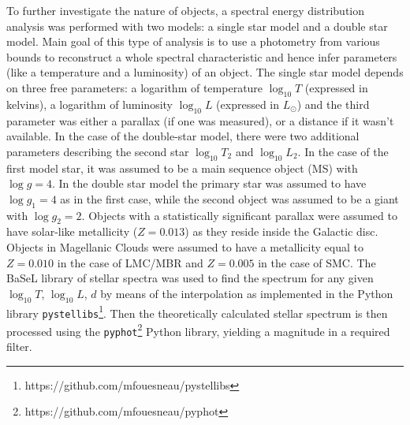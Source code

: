 \documentclass{pracalicmgr}
\begin{document}
To further investigate the nature of objects, a spectral energy distribution analysis was
performed with two models: a single star model and a double star model. Main goal of this type of analysis is to use a photometry from various bounds to
reconstruct a whole spectral characteristic and hence infer parameters (like a temperature and a luminosity) of an object.
The single star model depends on three free parameters: a logarithm of temperature $\log_{10}T$ (expressed in kelvins), a logarithm of luminosity $\log_{10} L$ (expressed in $L_{\odot}$) and the third
parameter was either a parallax (if one was measured), or a distance if it wasn't available. In the case of the double-star model, there were two additional parameters describing the
second star $\log_{10} T_2$ and $\log_{10} L_2$. In the case of the first model star, it was assumed to be a main sequence object (MS) with $\log{g}=4$. In the double star model the primary star
was assumed to have $\log{g_1}=4$ as in the first case, while the second object was assumed to be a giant with $\log{g_2}=2$. Objects with a statistically significant parallax were assumed to have solar-like
metallicity ($Z=0.013$) as they reside inside the Galactic disc. Objects in Magellanic Clouds
were assumed to have a metallicity equal to $Z=0.010$ in the case of LMC/MBR and $Z=0.005$ in the case of SMC.
The BaSeL library of stellar spectra \citep{lejeune_standard_1998} was used to find the spectrum for any given $\log_{10}{T}$, $\log_{10} L$, $d$ 
by means of the interpolation as implemented in the Python library
\texttt{pystellibs}\footnote{https://github.com/mfouesneau/pystellibs}.
Then the theoretically calculated stellar spectrum is then processed using the \texttt{pyphot}\footnote{https://github.com/mfouesneau/pyphot} 
Python library, yielding a magnitude in a required filter.
\end{document}

